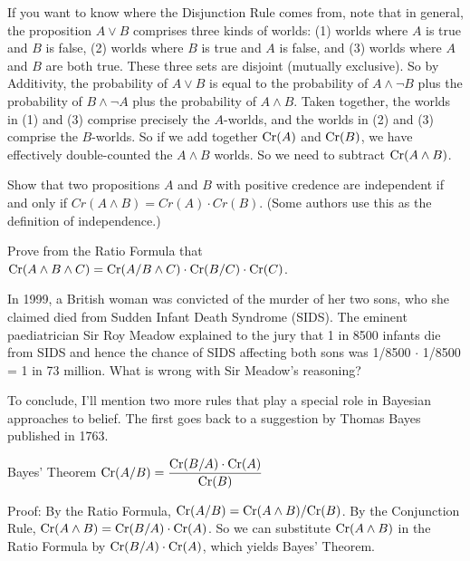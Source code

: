 If you want to know where the Disjunction Rule comes from, note that
in general, the proposition $A\lor B$ comprises three kinds of worlds:
(1) worlds where $A$ is true and $B$ is false, (2) worlds where $B$ is
true and $A$ is false, and (3) worlds where $A$ and $B$ are both true.
These three sets are disjoint (mutually exclusive). So by Additivity,
the probability of $A \lor B$ is equal to the probability of
$A \land \neg B$ plus the probability of $B \land \neg A$ plus the
probability of $A \land B$. Taken together, the worlds in (1) and (3)
comprise precisely the $A$-worlds, and the worlds in (2) and (3)
comprise the $B$-worlds. So if we add together $\text{Cr}(A)$ and $\text{Cr}(B)$,
we have effectively double-counted the $A \land B$ worlds. So we need
to subtract $\text{Cr}(A \land B)$.

\begin{exercise1}
  Show that two propositions $A$ and $B$ with positive credence are independent
  if and only if $Cr(A \land B) = Cr(A) \cdot Cr(B)$. (Some authors use this as
  the definition of independence.)
\end{exercise1}

\begin{exercise2}\label{e:chain-rule}
  Prove from the Ratio Formula that $\text{Cr}(A \land B \land C) = \text{Cr}(A/B
  \land C) \cdot \text{Cr}(B/C) \cdot \text{Cr}(C)$.
  \vspace{-2mm}
\end{exercise2}

\begin{exercise1}
  In 1999, a British woman was convicted of the murder of her two
  sons, who she claimed died from Sudden Infant Death Syndrome
  (SIDS). The eminent paediatrician Sir Roy Meadow explained to the
  jury that 1 in 8500 infants die from SIDS and hence the chance of
  SIDS affecting both sons was 1/8500 $\cdot$ 1/8500 = 1 in 73
  million. What is wrong with Sir Meadow's reasoning? 
\end{exercise1}

To conclude, I'll mention two more rules that play a special role in
Bayesian approaches to belief. The first goes back to a suggestion by Thomas
Bayes published in 1763.
%
\begin{genericthm}{Bayes' Theorem}
  \leavevmode\vspace{-3mm}
  \quad\newline
  $\text{Cr}(A/B) = \dfrac{\text{Cr}(B/A) \cdot \text{Cr}(A)}{\text{Cr}(B)}$
\end{genericthm}
%
Proof: By the Ratio Formula, $\text{Cr}(A/B) = \text{Cr}(A \land B) / \text{Cr}(B)$. By
the Conjunction Rule, $\text{Cr}(A \land B) = \text{Cr}(B/A) \cdot \text{Cr}(A)$. So we
can substitute $\text{Cr}(A \land B)$ in the Ratio Formula by
$\text{Cr}(B/A)\cdot \text{Cr}(A)$, which yields Bayes' Theorem.

